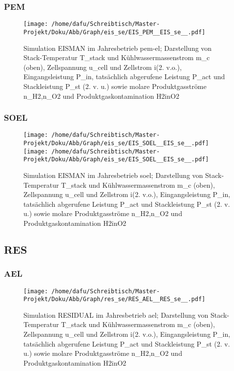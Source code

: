 \documentclass[onecolumn,10pt,titlepage]{article}
\begin{document}
\subsubsection{PEM}
\begin{figure}[H]
	\centering
	\texttt{[image: /home/dafu/Schreibtisch/Master-Projekt/Doku/Abb/Graph/eis\_se/EIS\_PEM\_\_EIS\_se\_\_.pdf]}

	\caption[Simulation EISMAN im Jahresbetrieb \gls{pem}-\gls{el}]{Simulation EISMAN im Jahresbetrieb \gls{pem}-\gls{el}; Darstellung von Stack-Temperatur \gls{T_stack} und Kühlwassermassenstrom \gls{m_c} (oben), Zellspannung \gls{u_cell} und Zellstrom \gls{i}(2. v.o.), Eingangsleistung \gls{P_in},  tatsächlich abgerufene Leistung \gls{P_act} und Stackleistung \gls{P_st} (2. v. u.) sowie molare Produktgasströme \gls{n_H2},\gls{n_O2} und Produktgaskontamination \gls{H2inO2}}
	\label{fig:plt_se_EIS_PEM}
\end{figure}
\subsubsection{SOEL}
\begin{figure}[H]

	\centering
	\texttt{[image: /home/dafu/Schreibtisch/Master-Projekt/Doku/Abb/Graph/eis\_se/EIS\_SOEL\_\_EIS\_se\_\_.pdf]}
	\texttt{[image: /home/dafu/Schreibtisch/Master-Projekt/Doku/Abb/Graph/eis\_se/EIS\_SOEL\_\_EIS\_se\_\_.pdf]}

	\caption[Simulation EISMAN im Jahresbetrieb \gls{soel}]{Simulation EISMAN im Jahresbetrieb \gls{soel}; Darstellung von Stack-Temperatur \gls{T_stack} und Kühlwassermassenstrom \gls{m_c} (oben), Zellspannung \gls{u_cell} und Zellstrom \gls{i}(2. v.o.), Eingangsleistung \gls{P_in},  tatsächlich abgerufene Leistung \gls{P_act} und Stackleistung \gls{P_st} (2. v. u.) sowie molare Produktgasströme \gls{n_H2},\gls{n_O2} und Produktgaskontamination \gls{H2inO2}}
	\label{fig:plt_se_EIS_SOEL}
\end{figure}
\subsection{RES}
\subsubsection{AEL}
\begin{figure}[H]
	\centering
	\texttt{[image: /home/dafu/Schreibtisch/Master-Projekt/Doku/Abb/Graph/res\_se/RES\_AEL\_\_RES\_se\_\_.pdf]}

	\caption[Simulation RESIDUAL im Jahresbetrieb \gls{ael}]{Simulation RESIDUAL im Jahresbetrieb \gls{ael}; Darstellung von Stack-Temperatur \gls{T_stack} und Kühlwassermassenstrom \gls{m_c} (oben), Zellspannung \gls{u_cell} und Zellstrom \gls{i}(2. v.o.), Eingangsleistung \gls{P_in},  tatsächlich abgerufene Leistung \gls{P_act} und Stackleistung \gls{P_st} (2. v. u.) sowie molare Produktgasströme \gls{n_H2},\gls{n_O2} und Produktgaskontamination \gls{H2inO2}}
	\label{fig:plt_se_RES_AEL}
\end{figure}
\end{document}
